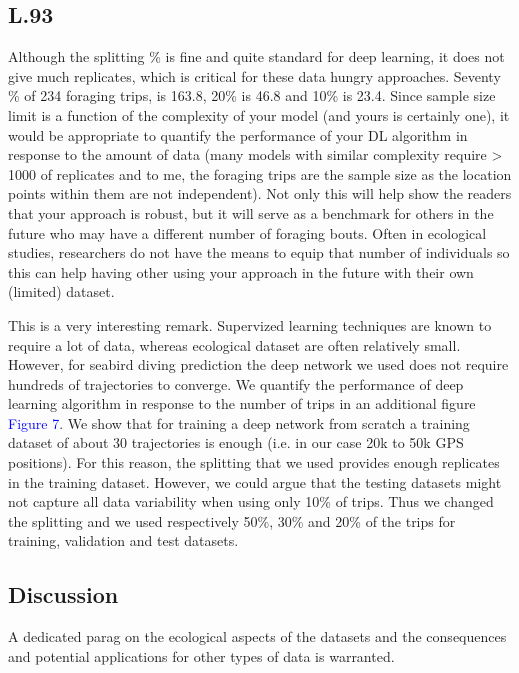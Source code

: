 \documentclass{ar2rc}
\begin{document}
\subsection*{L.93}

\RC Although the splitting \% is fine and quite standard for deep learning, it does not give much replicates, which is critical for these data hungry approaches. Seventy \% of 234 foraging trips, is 163.8, 20\% is 46.8 and 10\% is 23.4. Since sample size limit is a function of the complexity of your model (and yours is certainly one), it would be appropriate to quantify the performance of your DL algorithm in response to the amount of data (many models with similar complexity require > 1000 of replicates and to me, the foraging trips are the sample size as the location points within them are not independent). Not only this will help show the readers that your approach is robust, but it will serve as a benchmark for others in the future who may have a different number of foraging bouts. Often in ecological studies, researchers do not have the means to equip that number of individuals so this can help having other using your approach in the future with their own (limited) dataset.

\AR This is a very interesting remark. Supervized learning techniques are known to require a lot of data, whereas ecological dataset are often relatively small. However, for seabird diving prediction the deep network we used does not require hundreds of trajectories to converge. We quantify the performance of deep learning algorithm in response to the number of trips in an additional figure \textcolor{blue}{Figure 7}. We show that for training a deep network from scratch a training dataset of about 30 trajectories is enough (i.e. in our case 20k to 50k GPS positions). For this reason, the splitting that we used provides enough replicates in the training dataset. However, we could argue that the testing datasets might not capture all data variability when using only 10\% of trips. Thus we changed the splitting and we used respectively 50\%, 30\% and 20\% of the trips for training, validation and test datasets.

\subsection*{Discussion}

\RC A dedicated parag on the ecological aspects of the datasets and the consequences and potential applications for other types of data is warranted.
\end{document}
